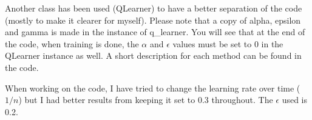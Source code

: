 \documentclass[12pt,a4paper]{article}
\begin{document}
Another class has been used (QLearner) to have a better separation of the code (mostly to make it clearer for myself). Please note that a copy of alpha, epsilon and gamma is made in the instance of q\_learner. You will see that at the end of the code, when training is done, the $\alpha$ and $\epsilon$ values must be set to $0$ in the QLearner instance as well. 
A short description for each method can be found in the code.

When working on the code, I have tried to change the learning rate over time ($1/n$) but I had better results from keeping it set to 0.3 throughout. The $\epsilon$ used is 0.2.


	
	
\end{document}
